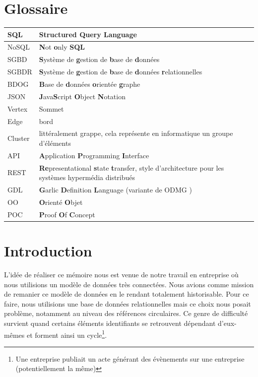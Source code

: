 \documentclass[a4paper,fleqn,12pt,oneside]{report}
\begin{document}
\chapter*{Glossaire}
\begin{center}
\begin{tabular}[c]{ l p{14cm} }
 SQL  & \textbf{S}tructured \textbf{Q}uery \textbf{L}anguage \\ \hline
 NoSQL  & \textbf{N}ot \textbf{o}nly \textbf{SQL} \\ \hline
 SGBD  & \textbf{S}ystème de \textbf{g}estion de \textbf{b}ase de \textbf{d}onnées \\ \hline
 SGBDR  & \textbf{S}ystème de \textbf{g}estion de \textbf{b}ase de \textbf{d}onnées \textbf{r}elationnelles \\ \hline
 BDOG  & \textbf{B}ase de \textbf{d}onnées \textbf{o}rientée \textbf{g}raphe \\ \hline
 JSON  & \textbf{J}ava\textbf{S}cript \textbf{O}bject \textbf{N}otation \\ \hline
 Vertex  & Sommet \\ \hline
 Edge  & bord \\ \hline
 Cluster  & littéralement grappe, cela représente en informatique un groupe d'éléments \\ \hline
 API  & \textbf{A}pplication \textbf{P}rogramming \textbf{I}nterface  \\ \hline
 REST  & \textbf{Re}presentational \textbf{s}tate \textbf{t}ransfer, style d'architecture pour les systèmes hypermédia distribués \\ \hline
 GDL & \textbf{G}arlic \textbf{D}efinition \textbf{L}anguage (variante de ODMG \cite{cattell1997object}) \\ \hline
 OO & \textbf{O}rienté \textbf{O}bjet \\ \hline
 POC & \textbf{P}roof \textbf{O}f \textbf{C}oncept \\ \hline
\end{tabular}
\end{center}
\clearpage
\setcounter{page}{1}
\chapter{Introduction}

L'idée de réaliser ce mémoire nous est venue de notre travail en entreprise où nous utilisions un modèle de données très connectées. Nous avions comme mission de remanier ce modèle de données en le rendant totalement historisable. Pour ce faire, nous utilisions une base de données relationnelles mais ce choix nous posait problème, notamment au niveau des références circulaires. Ce genre de difficulté survient quand certains éléments identifiants se retrouvent dépendant d'eux-mêmes et forment ainsi un cycle\footnote{Une entreprise publiait un acte générant des évènements sur une entreprise (potentiellement la même)}. 
\end{document}
